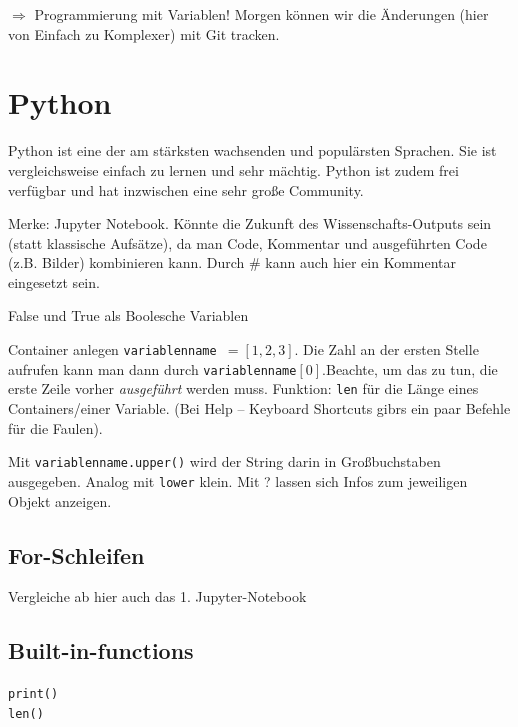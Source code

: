 \documentclass[11pt, a4paper, german]{article}
\begin{document}
  $\Rightarrow$ Programmierung mit Variablen! Morgen können wir die Änderungen (hier von Einfach zu Komplexer) mit Git tracken. 
  
  \section{Python}
  Python ist eine der am stärksten wachsenden und populärsten Sprachen. Sie ist vergleichsweise einfach zu lernen und sehr mächtig. Python ist zudem frei verfügbar und hat inzwischen eine sehr große Community. 
  
  Merke: Jupyter Notebook. Könnte die Zukunft des Wissenschafts-Outputs sein (statt klassische Aufsätze), da man Code, Kommentar und ausgeführten Code (z.B. Bilder) kombinieren kann. Durch \# kann auch hier ein Kommentar eingesetzt sein.
  
  False und True als Boolesche Variablen
  
  Container anlegen \texttt{variablenname $=[1, 2, 3]$}. Die Zahl an der ersten Stelle aufrufen kann man dann durch \texttt{variablenname$[0]$}.Beachte, um das zu tun, die erste Zeile vorher \emph{ausgeführt} werden muss. Funktion: \texttt{len} für die Länge eines Containers/einer Variable. (Bei Help -- Keyboard Shortcuts gibrs ein paar Befehle für die Faulen).
  
  Mit \texttt{variablenname.upper()} wird der String darin in Großbuchstaben ausgegeben. Analog mit \texttt{lower} klein. Mit ? lassen sich Infos zum jeweiligen Objekt anzeigen. 
  
  \subsection{For-Schleifen}
  Vergleiche ab hier auch das 1. Jupyter-Notebook
  
  \subsection{Built-in-functions}
  \noindent\texttt{print()}\\
  \texttt{len()}\\
	
\end{document}
